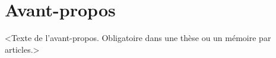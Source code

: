 \chapter*{Avant-propos}         %
\label{chap:avantpropos}        %

<Texte de l'avant-propos. Obligatoire dans une thèse ou un mémoire par
articles.>
